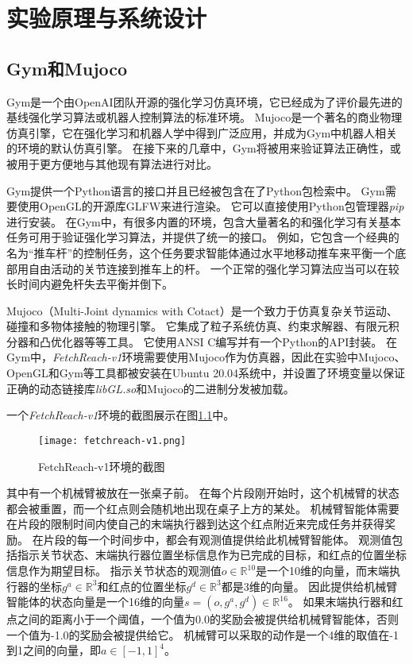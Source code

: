 
\chapter{实验原理与系统设计}

\section{Gym和Mujoco}\label{introenv}
Gym\cite{brockman2016openai}是一个由OpenAI团队开源的强化学习仿真环境，它已经成为了评价最先进的基线强化学习算法或机器人控制算法的标准环境。
Mujoco\cite{todorov2012mujoco}是一个著名的商业物理仿真引擎，它在强化学习和机器人学中得到广泛应用，并成为Gym中机器人相关的环境的默认仿真引擎。
在接下来的几章中，Gym将被用来验证算法正确性，或被用于更方便地与其他现有算法进行对比。

Gym提供一个Python语言的接口并且已经被包含在了Python包检索中。
Gym需要使用OpenGL的开源库GLFW来进行渲染。
它可以直接使用Python包管理器\emph{pip}进行安装。
在Gym中，有很多内置的环境，包含大量著名的和强化学习有关基本任务可用于验证强化学习算法，并提供了统一的接口。
例如，它包含一个经典的名为“推车杆”的控制任务，这个任务要求智能体通过水平地移动推车来平衡一个底部用自由活动的关节连接到推车上的杆。
一个正常的强化学习算法应当可以在较长时间内避免杆失去平衡并倒下。

Mujoco（Multi-Joint dynamics with Cotact）是一个致力于仿真复杂关节运动、碰撞和多物体接触的物理引擎。
它集成了粒子系统仿真、约束求解器、有限元积分器和凸优化器等等工具。
它使用ANSI C编写并有一个Python的API封装。
在Gym中，\emph{FetchReach-v1}环境需要使用Mujoco作为仿真器，因此在实验中Mujoco、OpenGL和Gym等工具都被安装在Ubuntu 20.04系统中，并设置了环境变量以保证正确的动态链接库\emph{libGL.so}和Mujoco的二进制分发被加载。

一个\emph{FetchReach-v1}环境的截图展示在图\ref{fetchreach-v1}中。
    \begin{figure}[htpb]
        \centering
        \texttt{[image: fetchreach-v1.png]}
        \caption{FetchReach-v1环境的截图}
        \label{fetchreach-v1}
    \end{figure}
其中有一个机械臂被放在一张桌子前。
在每个片段刚开始时，这个机械臂的状态都会被重置，而一个红点则会随机地出现在桌子上方的某处。
机械臂智能体需要在片段的限制时间内使自己的末端执行器到达这个红点附近来完成任务并获得奖励。
在片段的每一个时间步中，都会有观测值提供给此机械臂智能体。
观测值包括指示关节状态、末端执行器位置坐标信息作为已完成的目标，和红点的位置坐标信息作为期望目标。
指示关节状态的观测值$o\in \mathbb R^{10}$是一个10维的向量，而末端执行器的坐标$g^a \in \mathbb R^3$和红点的位置坐标$g^d\in\mathbb R^3$都是3维的向量。
因此提供给机械臂智能体的状态向量是一个16维的向量$s=(o, g^a, g^d)\in \mathbb R^{16}$。
如果末端执行器和红点之间的距离小于一个阈值，一个值为0.0的奖励会被提供给机械臂智能体，否则一个值为-1.0的奖励会被提供给它。
机械臂可以采取的动作是一个4维的取值在-1到1之间的向量，即$a\in[-1,1]^4$。

